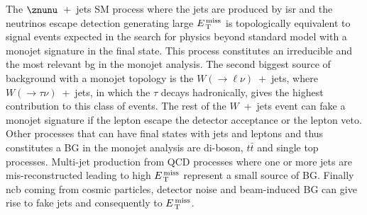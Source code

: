 The $\znunu$~+~jets SM process where the jets are produced by \gls{isr} and the
neutrinos escape detection generating large $E_\mathrm{\, T}^\mathrm{\, miss}$ is topologically equivalent
to signal events expected in the search for physics beyond standard model with a
monojet signature in the final state. This process constitutes an irreducible
and the most relevant \gls{bg} in the monojet analysis. The second biggest
source of background with a monojet topology is the
$W (\rightarrow \ell \nu)$~+~jets, where $W (\rightarrow \tau \nu)$~+~jets, in
which the $\tau$ decays hadronically, gives the highest contribution to this
class of events. The rest of the $W$~+~jets event can fake a monojet signature
if the lepton escape the detector acceptance or the lepton veto. Other processes
that can have final states with jets and leptons and thus constitutes a BG in
the monojet analysis are di-boson, $t \bar{t}$ and single top
processes. Multi-jet production from QCD processes where one or more jets are
mis-reconstructed leading to high $E_\mathrm{\, T}^\mathrm{\, miss}$ represent a small source of
BG\@. Finally \gls{ncb} coming from cosmic particles, detector noise and
beam-induced BG can give rise to fake jets and consequently to $E_\mathrm{\, T}^\mathrm{\, miss}$.
